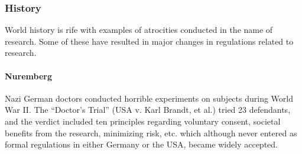 \documentclass[12pt] {article}
\begin{document}
\subsubsection{History}\label{history}

World history is rife with examples of atrocities conducted in the name
of research. Some of these have resulted in major changes in regulations
related to research.

\paragraph{Nuremberg}\label{nuremberg}

Nazi German doctors conducted horrible experiments on subjects during
World War II. The ``Doctor's Trial'' (USA v. Karl Brandt, et al.) tried
23 defendants, and the verdict included ten principles regarding voluntary consent, societal benefits from the research, minimizing risk, etc.
which although never entered as formal regulations in either Germany or
the USA, became widely accepted.


\end{document}
